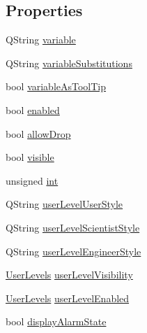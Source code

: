 \subsection*{Properties}
\begin{DoxyCompactItemize}
\item 
QString \hyperlink{classQEPvProperties_a31bee423fb3b272fe17668fc0345e09d}{variable}
\item 
QString \hyperlink{classQEPvProperties_a789c36ecaf17a83e04f8beaaf194577d}{variableSubstitutions}
\item 
bool \hyperlink{classQEPvProperties_ab48657eda59899edf0fbcce4305f98ba}{variableAsToolTip}
\item 
bool \hyperlink{classQEPvProperties_a89fe9ff0954fac3081a0f5dd3493a98b}{enabled}
\item 
bool \hyperlink{classQEPvProperties_af944305bf3dd55015fdf69105b37bdfc}{allowDrop}
\item 
bool \hyperlink{classQEPvProperties_a746d04a72a50e51f1515b4671bd3107f}{visible}
\item 
unsigned \hyperlink{classQEPvProperties_a7b8252acba093bdeffd6e60a33484b32}{int}
\item 
QString \hyperlink{classQEPvProperties_ac9e82c5be2c61946398ebadc1be0f03e}{userLevelUserStyle}
\item 
QString \hyperlink{classQEPvProperties_aec6d7d2e947defa3001578d26cdeec79}{userLevelScientistStyle}
\item 
QString \hyperlink{classQEPvProperties_adbcc38c93b8efc6ea3c809a95fb7ecac}{userLevelEngineerStyle}
\item 
\hyperlink{classQEPvProperties_affb354a03ed5e2905586fad96fd9cb32}{UserLevels} \hyperlink{classQEPvProperties_ab298719b9ac151954f8ce9c9586f887f}{userLevelVisibility}
\item 
\hyperlink{classQEPvProperties_affb354a03ed5e2905586fad96fd9cb32}{UserLevels} \hyperlink{classQEPvProperties_af97fe8a974987d11ba381862c9688797}{userLevelEnabled}
\item 
bool \hyperlink{classQEPvProperties_af2a9e3de8c29577cbd930a0410ce94b3}{displayAlarmState}
\end{DoxyCompactItemize}


